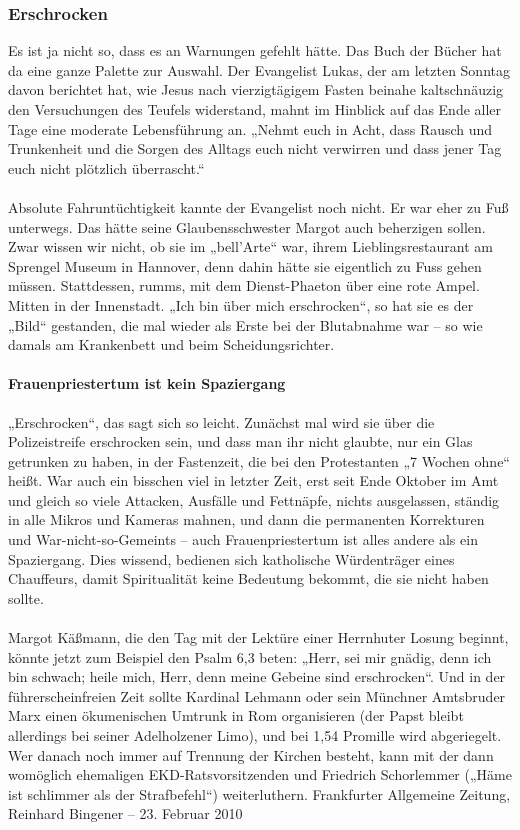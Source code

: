 \documentclass[a4paper,12pt,twoside]{scrbook}
\begin{document}
\subsubsection{Erschrocken}
Es ist ja nicht so, dass es an Warnungen gefehlt hätte. Das Buch der Bücher hat da eine ganze Palette zur Auswahl. Der Evangelist Lukas, der am letzten Sonntag davon berichtet hat, wie Jesus nach vierzigtägigem Fasten beinahe kaltschnäuzig den Versuchungen des Teufels widerstand, mahnt im Hinblick auf das Ende aller Tage eine moderate Lebensführung an. „Nehmt euch in Acht, dass Rausch und Trunkenheit und die Sorgen des Alltags euch nicht verwirren und dass jener Tag euch nicht plötzlich überrascht.“
\\\\
Absolute Fahruntüchtigkeit kannte der Evangelist noch nicht. Er war eher zu Fuß unterwegs. Das hätte seine Glaubensschwester Margot auch beherzigen sollen. Zwar wissen wir nicht, ob sie im „bell’Arte“ war, ihrem Lieblingsrestaurant am Sprengel Museum in Hannover, denn dahin hätte sie eigentlich zu Fuss gehen müssen. Stattdessen, rumms, mit dem Dienst-Phaeton über eine rote Ampel. Mitten in der Innenstadt. „Ich bin über mich erschrocken“, so hat sie es der „Bild“ gestanden, die mal wieder als Erste bei der Blutabnahme war – so wie damals am Krankenbett und beim Scheidungsrichter.
 \paragraph{Frauenpriestertum ist kein Spaziergang}
 „Erschrocken“, das sagt sich so leicht. Zunächst mal wird sie über die Polizeistreife erschrocken sein, und dass man ihr nicht glaubte, nur ein Glas getrunken zu haben, in der Fastenzeit, die bei den Protestanten „7 Wochen ohne“ heißt. War auch ein bisschen viel in letzter Zeit, erst seit Ende Oktober im Amt und gleich so viele Attacken, Ausfälle und Fettnäpfe, nichts ausgelassen, ständig in alle Mikros und Kameras mahnen, und dann die permanenten Korrekturen und War-nicht-so-Gemeints – auch Frauenpriestertum ist alles andere als ein Spaziergang. Dies wissend, bedienen sich katholische Würdenträger eines Chauffeurs, damit Spiritualität keine Bedeutung bekommt, die sie nicht haben sollte.
\\\\
Margot Käßmann, die den Tag mit der Lektüre einer Herrnhuter Losung beginnt, könnte jetzt zum Beispiel den Psalm 6,3 beten: „Herr, sei mir gnädig, denn ich bin schwach; heile mich, Herr, denn meine Gebeine sind erschrocken“. Und in der führerscheinfreien Zeit sollte Kardinal Lehmann oder sein Münchner Amtsbruder Marx einen ökumenischen Umtrunk in Rom organisieren (der Papst bleibt allerdings bei seiner Adelholzener Limo), und bei 1,54 Promille wird abgeriegelt. Wer danach noch immer auf Trennung der Kirchen besteht, kann mit der dann womöglich ehemaligen EKD-Ratsvorsitzenden und Friedrich Schorlemmer („Häme ist schlimmer als der Strafbefehl“) weiterluthern.
Frankfurter Allgemeine Zeitung, Reinhard Bingener \hfill -- \hfill 23. Februar 2010
\end{document}
